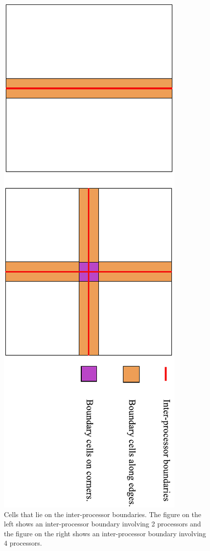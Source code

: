 \begin{figure}
 \begin{center}
   \includegraphics[angle=90, width=\textwidth]{images/numComm}
 \end{center}
 \caption{Cells that lie on the inter-processor boundaries. The
figure on the left shows an inter-processor boundary involving 2
processors and the figure on the right shows an inter-processor
boundary involving 4 processors.}
 \label{fig:numComm}
\end{figure}

